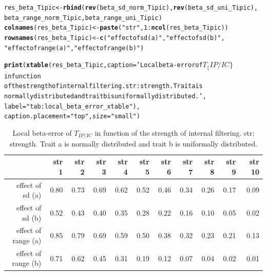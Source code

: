\documentclass[12pt]{article}\usepackage[]{graphicx}\usepackage[]{color}
\makeatletter
\newcommand{\hlnum}[1]{\textcolor[rgb]{0.686,0.059,0.569}{#1}}%
\newcommand{\hlstr}[1]{\textcolor[rgb]{0.192,0.494,0.8}{#1}}%
\newcommand{\hlopt}[1]{\textcolor[rgb]{0,0,0}{#1}}%
\newcommand{\hlstd}[1]{\textcolor[rgb]{0.345,0.345,0.345}{#1}}%
\newcommand{\hlkwb}[1]{\textcolor[rgb]{0.69,0.353,0.396}{#1}}%
\newcommand{\hlkwc}[1]{\textcolor[rgb]{0.333,0.667,0.333}{#1}}%
\newcommand{\hlkwd}[1]{\textcolor[rgb]{0.737,0.353,0.396}{\textbf{#1}}}%
\newenvironment{kframe}{%
 \def\at@end@of@kframe{}%
 \ifinner\ifhmode%
  \def\at@end@of@kframe{\end{minipage}}%
  \begin{minipage}{\columnwidth}%
 \fi\fi%
 \def\FrameCommand##1{\hskip\@totalleftmargin \hskip-\fboxsep
 \colorbox{shadecolor}{##1}\hskip-\fboxsep
     \hskip-\linewidth \hskip-\@totalleftmargin \hskip\columnwidth}%
 \MakeFramed {\advance\hsize-\width
   \@totalleftmargin\z@ \linewidth\hsize
   \@setminipage}}%
 {\par\unskip\endMakeFramed%
 \at@end@of@kframe}
\newenvironment{knitrout}{}{} %
\makeatother
\begin{document}
\begin{knitrout}
\begin{kframe}
\begin{alltt}
\hlstd{res_beta_Tipic} \hlkwb{<-} \hlkwd{rbind}\hlstd{(}\hlkwd{rev}\hlstd{(beta_sd_norm_Tipic),} \hlkwd{rev}\hlstd{(beta_sd_uni_Tipic),}
      \hlstd{beta_range_norm_Tipic, beta_range_uni_Tipic)}
\hlkwd{colnames}\hlstd{(res_beta_Tipic)} \hlkwb{<-} \hlkwd{paste}\hlstd{(}\hlstr{"str"}\hlstd{,} \hlnum{1}\hlopt{:}\hlkwd{ncol}\hlstd{(res_beta_Tipic))}
\hlkwd{rownames}\hlstd{(res_beta_Tipic)} \hlkwb{<-} \hlkwd{c}\hlstd{(}\hlstr{"effect of sd (a)"}\hlstd{,} \hlstr{"effect of sd (b)"}\hlstd{,}
        \hlstr{"effect of range (a)"}\hlstd{,} \hlstr{"effect of range (b)"}\hlstd{)}
\end{alltt}
\end{kframe}
\end{knitrout}

\begin{kframe}
\begin{alltt}
\hlkwd{print}\hlstd{(}\hlkwd{xtable}\hlstd{(res_beta_Tipic,} \hlkwc{caption} \hlstd{=} \hlstr{'Local beta-error of $T_\{IP/IC\}$ in function 
             of the strength of internal filtering. str: strength. Trait a is 
             normally distributed and trait b is uniformally distributed.'}\hlstd{,}
             \hlkwc{label} \hlstd{=} \hlstr{"tab:local_beta_error_xtable"}\hlstd{),}
      \hlkwc{caption.placement} \hlstd{=} \hlstr{"top"}\hlstd{,} \hlkwc{size} \hlstd{=} \hlstr{"small"}\hlstd{)}
\end{alltt}
\end{kframe}%
\begin{table}[ht]
\centering
\caption{Local beta-error of $T_{IP/IC}$ in function 
             of the strength of internal filtering. str: strength. Trait a is 
             normally distributed and trait b is uniformally distributed.} 
\label{tab:local_beta_error_xtable}
{\small
\begin{tabular}{rrrrrrrrrrr}
  \hline
 & str 1 & str 2 & str 3 & str 4 & str 5 & str 6 & str 7 & str 8 & str 9 & str 10 \\ 
  \hline
effect of sd (a) & 0.80 & 0.73 & 0.69 & 0.62 & 0.52 & 0.46 & 0.34 & 0.26 & 0.17 & 0.09 \\ 
  effect of sd (b) & 0.52 & 0.43 & 0.40 & 0.35 & 0.28 & 0.22 & 0.16 & 0.10 & 0.05 & 0.02 \\ 
  effect of range (a) & 0.85 & 0.79 & 0.69 & 0.59 & 0.50 & 0.38 & 0.32 & 0.23 & 0.21 & 0.13 \\ 
  effect of range (b) & 0.71 & 0.62 & 0.45 & 0.31 & 0.19 & 0.12 & 0.07 & 0.04 & 0.02 & 0.01 \\ 
   \hline
\end{tabular}
}
\end{table}
\end{document}
